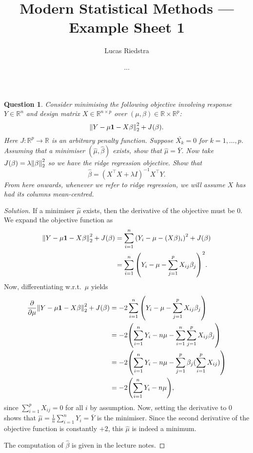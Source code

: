 \documentclass{article}
\title{Modern Statistical Methods --- Example Sheet 1} %
\author{Lucas Riedstra}
\date{...} %
\theoremstyle{plain}
\newtheorem{question}{Question}
\theoremstyle{remark}
\newenvironment{qbox}{\begin{mdframed}\begin{question}}{\end{question}\end{mdframed}}
\newenvironment{solution}{\begin{proof}[Solution]\renewcommand\qedsymbol{}}{\end{proof}}
\newcommand{\Bb}{\mathbb}
\newcommand{\Bf}{\mathbf}
\newcommand{\RR}{\Bb R}
\newcommand{\T}{^\top} %
\begin{document}
\maketitle

\begin{qbox}
    Consider minimising the following objective involving response $Y \in \RR^n$ and design matrix $X \in \RR^{n \times p}$ over $(\mu, \beta) \in \RR \times \RR^p$: 
    \[
    \norm{Y - \mu \Bf{1} - X\beta}_2^2 + J(\beta).
    \]
    Here $J \colon \RR^p \to \RR$ is an arbitrary penalty function. Suppose $\bar{X_k} = 0$ for $k = 1, \dotsc, p$. Assuming that a minimiser $(\hat\mu, \hat\beta)$ exists, show that $\hat\mu = \bar Y$. Now take $J(\beta) = \lambda \norm{\beta}_2^2$ so we have the ridge regression objective. Show that
    \[
    \hat\beta = (X\T X + \lambda I)^{-1} X\T Y.
    \] 
    From here onwards, whenever we refer to ridge regression, we will assume $X$ has had its columns mean-centred. 
\end{qbox}

\begin{solution}
    If a minimiser $\hat\mu$ exists, then the derivative of the objective must be 0. We expand the objective function as
    \begin{align*}
    \norm{Y - \mu\Bf{1} - X\beta}_2^2 + J(\beta) &= \sum_{i=1}^n \qty(Y_i - \mu - (X\beta)_i)^2 + J(\beta) \\
    &= \sum_{i=1}^n \qty(Y_i - \mu - \sum_{j=1}^p X_{ij}\beta_j)^2. 
    \end{align*}
Now, differentiating w.r.t.\ $\mu$ yields
\begin{align*}
\pdv{\mu} \norm{Y - \mu\Bf{1} - X\beta}_2^2 + J(\beta) &= -2 \sum_{i=1}^n \qty( Y_i - \mu - \sum_{j=1}^p X_{ij}\beta_j) \\
&= -2 \qty(\sum_{i=1}^n Y_i  - n\mu - \sum_{i=1}^n \sum_{j=1}^p X_{ij}\beta_j) \\
&= -2 \qty(\sum_{i=1}^n Y_i  - n\mu - \sum_{j=1}^p \beta_j (\sum_{i=1}^p X_{ij})) \\
&= -2 \qty( \sum_{i=1}^n Y_i - n\mu), 
\end{align*}
since $\sum_{i=1}^p X_{ij} = 0$ for all $i$ by assumption. Now, setting the derivative to 0 shows that $\hat\mu = \frac1n \sum_{i=1}^n Y_i = \bar Y$ is the minimiser. Since the second derivative of the objective function is constantly $+2$, this $\hat\mu$ is indeed a minimum. 

The computation of $\hat\beta$ is given in the lecture notes. 
\end{solution}
\end{document}
